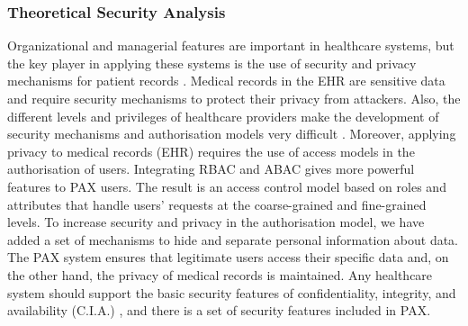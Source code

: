 \documentclass[journal,article,submit,moreauthors,pdftex]{Definitions/mdpi}
\begin{document}
\subsubsection{Theoretical Security Analysis}
Organizational and managerial features are important in healthcare systems, but the key player in applying these systems is the use of security and privacy mechanisms for patient records \cite{fp9}. Medical records in the EHR are sensitive data and require security mechanisms to protect their privacy from attackers. Also, the different levels and privileges of healthcare providers make the development of security mechanisms and authorisation models very difficult \cite{fp8}. Moreover, applying privacy to medical records (EHR) requires the use of access models in the authorisation of users. Integrating RBAC and ABAC gives more powerful features to PAX users.  The result is an access control model based on roles and attributes that handle users' requests at the coarse-grained and fine-grained levels. To increase security and privacy in the authorisation model, we have added a set of mechanisms to hide and separate personal information about data. The PAX system ensures that legitimate users access their specific data and, on the other hand, the privacy of medical records is maintained. Any healthcare system should support the basic security features of confidentiality, integrity, and availability (C.I.A.) \cite{fp3}, and there is a set of security features included in PAX.
\end{document}
